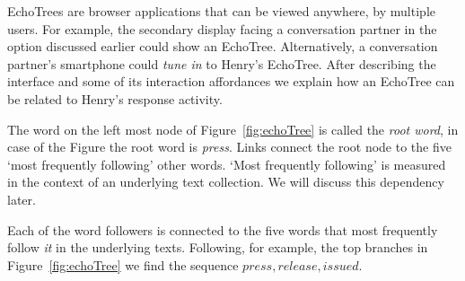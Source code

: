 \documentclass{sigchi}
\begin{document}
EchoTrees are browser applications that can be viewed anywhere, by
multiple users. For example, the secondary display facing a
conversation partner in the option discussed earlier could show an
EchoTree. Alternatively, a conversation partner's smartphone could
{\em tune in} to Henry's EchoTree. After describing the interface and
some of its interaction affordances we explain how an EchoTree can be
related to Henry's response activity.

The word on the left most node of Figure~\ref{fig:echoTree} is called
the {\em root word}, in case of the Figure the root word is {\em
  press}. Links connect the root node to the five `most frequently
following' other words.  `Most frequently following' is measured in
the context of an underlying text collection. We will discuss this
dependency later.

Each of the word followers is connected to the five words that most
frequently follow {\em it} in the underlying texts. Following, for
example, the top branches in Figure~\ref{fig:echoTree} we find the
sequence ${press, release, issued}$.
\end{document}
